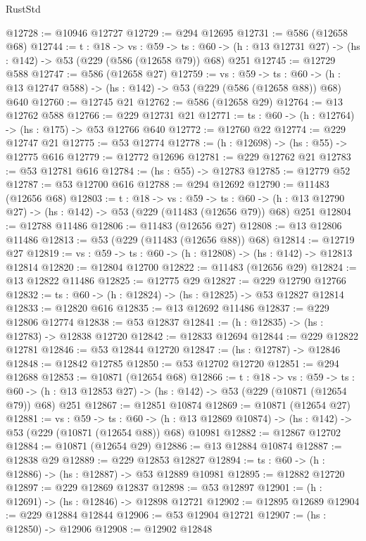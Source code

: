 \begin{lexlean}{RustStd}
\begin{coremodule}
@12728 := @10946 @12727
@12729 := @294 @12695
@12731 := @586 (@12658 @68)
@12744 := {t : @18} ->
  {vs : @59} ->
  {ts : @60} -> (h : @13 @12731 @27) -> (hs : @142) -> @53 (@229 (@586 (@12658 @79)) @68) @251
@12745 := @12729 @588
@12747 := @586 (@12658 @27)
@12759 := {vs : @59} ->
  {ts : @60} -> (h : @13 @12747 @588) -> (hs : @142) -> @53 (@229 (@586 (@12658 @88)) @68) @640
@12760 := @12745 @21
@12762 := @586 (@12658 @29)
@12764 := @13 @12762 @588
@12766 := @229 @12731 @21
@12771 := {ts : @60} -> (h : @12764) -> (hs : @175) -> @53 @12766 @640
@12772 := @12760 @22
@12774 := @229 @12747 @21
@12775 := @53 @12774
@12778 := (h : @12698) -> (hs : @55) -> @12775 @616
@12779 := @12772 @12696
@12781 := @229 @12762 @21
@12783 := @53 @12781 @616
@12784 := (hs : @55) -> @12783
@12785 := @12779 @52
@12787 := @53 @12700 @616
@12788 := @294 @12692
@12790 := @11483 (@12656 @68)
@12803 := {t : @18} ->
  {vs : @59} ->
  {ts : @60} -> (h : @13 @12790 @27) -> (hs : @142) -> @53 (@229 (@11483 (@12656 @79)) @68) @251
@12804 := @12788 @11486
@12806 := @11483 (@12656 @27)
@12808 := @13 @12806 @11486
@12813 := @53 (@229 (@11483 (@12656 @88)) @68)
@12814 := @12719 @27
@12819 := {vs : @59} -> {ts : @60} -> (h : @12808) -> (hs : @142) -> @12813 @12814
@12820 := @12804 @12700
@12822 := @11483 (@12656 @29)
@12824 := @13 @12822 @11486
@12825 := @12775 @29
@12827 := @229 @12790 @12766
@12832 := {ts : @60} -> (h : @12824) -> (hs : @12825) -> @53 @12827 @12814
@12833 := @12820 @616
@12835 := @13 @12692 @11486
@12837 := @229 @12806 @12774
@12838 := @53 @12837
@12841 := (h : @12835) -> (hs : @12783) -> @12838 @12720
@12842 := @12833 @12694
@12844 := @229 @12822 @12781
@12846 := @53 @12844 @12720
@12847 := (hs : @12787) -> @12846
@12848 := @12842 @12785
@12850 := @53 @12702 @12720
@12851 := @294 @12688
@12853 := @10871 (@12654 @68)
@12866 := {t : @18} ->
  {vs : @59} ->
  {ts : @60} -> (h : @13 @12853 @27) -> (hs : @142) -> @53 (@229 (@10871 (@12654 @79)) @68) @251
@12867 := @12851 @10874
@12869 := @10871 (@12654 @27)
@12881 := {vs : @59} ->
  {ts : @60} ->
  (h : @13 @12869 @10874) -> (hs : @142) -> @53 (@229 (@10871 (@12654 @88)) @68) @10981
@12882 := @12867 @12702
@12884 := @10871 (@12654 @29)
@12886 := @13 @12884 @10874
@12887 := @12838 @29
@12889 := @229 @12853 @12827
@12894 := {ts : @60} -> (h : @12886) -> (hs : @12887) -> @53 @12889 @10981
@12895 := @12882 @12720
@12897 := @229 @12869 @12837
@12898 := @53 @12897
@12901 := (h : @12691) -> (hs : @12846) -> @12898 @12721
@12902 := @12895 @12689
@12904 := @229 @12884 @12844
@12906 := @53 @12904 @12721
@12907 := (hs : @12850) -> @12906
@12908 := @12902 @12848

\end{coremodule}
\end{lexlean}
